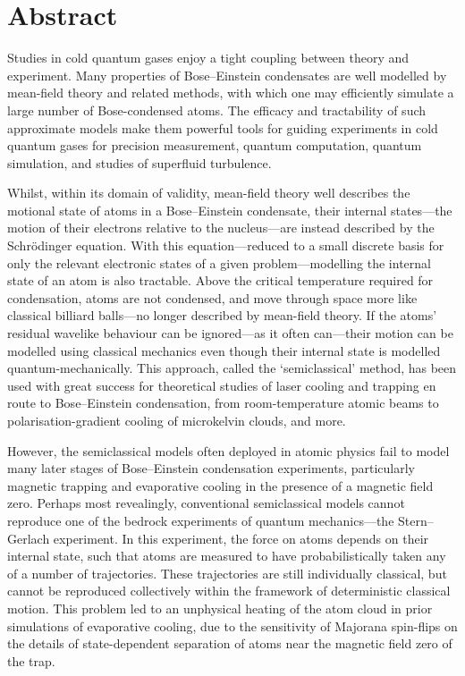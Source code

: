 \vspace*{\fill}
\vspace*{\fill}

\chapter*{Abstract}

Studies in cold quantum gases enjoy a tight coupling between theory and experiment. Many properties of Bose--Einstein condensates are well modelled by mean-field theory and related methods, with which one may efficiently simulate a large number of Bose-condensed atoms. The efficacy and tractability of such approximate models make them powerful tools for guiding experiments in cold quantum gases for precision measurement, quantum computation, quantum simulation, and studies of superfluid turbulence.

Whilst, within its domain of validity, mean-field theory well describes the motional state of atoms in a Bose--Einstein condensate, their internal states---the motion of their electrons relative to the nucleus---are instead described by the Schr\"odinger equation. With this equation---reduced to a small discrete basis for only the relevant electronic states of a given problem---modelling the internal state of an atom is also tractable. Above the critical temperature required for condensation, atoms are not condensed, and move through space more like classical billiard balls---no longer described by mean-field theory. If the atoms' residual wavelike behaviour can be ignored---as it often can---their motion can be modelled using classical mechanics even though their internal state is modelled quantum-mechanically. This approach, called the `semiclassical' method, has been used with great success for theoretical studies of laser cooling and trapping en route to Bose--Einstein condensation, from room-temperature atomic beams to polarisation-gradient cooling of microkelvin clouds, and more.

However, the semiclassical models often deployed in atomic physics fail to model many later stages of Bose--Einstein condensation experiments, particularly magnetic trapping and evaporative cooling in the presence of a magnetic field zero. Perhaps most revealingly, conventional semiclassical models cannot reproduce one of the bedrock experiments of quantum mechanics---the Stern--Gerlach experiment. In this experiment, the force on atoms depends on their internal state, such that atoms are measured to have probabilistically taken any of a number of trajectories. These trajectories are still individually classical, but cannot be reproduced collectively within the framework of deterministic classical motion. This problem led to an unphysical heating of the atom cloud in prior simulations of evaporative cooling, due to the sensitivity of Majorana spin-flips on the details of state-dependent separation of atoms near the magnetic field zero of the trap.

